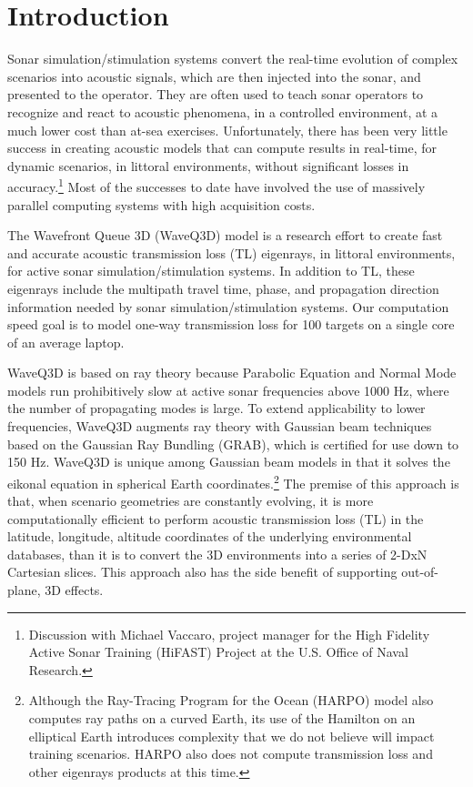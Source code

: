 \documentclass{ws-jca}
\newcommand{\threeD}{3\nobreakdash\textendash D }	%
\begin{document}
\keywords{Gaussian beams; \threeD modeling; range-dependent; time-domain.}

\section{Introduction}

Sonar simulation/stimulation systems convert the real-time evolution of complex scenarios into acoustic signals, which are then injected into the sonar, and presented to the operator.  They are often used to teach sonar operators to recognize and react to acoustic phenomena, in a controlled environment, at a much lower cost than at-sea exercises.  Unfortunately, there has been very little success in creating acoustic models that can compute results in real-time, for dynamic scenarios, in littoral environments, without significant losses in accuracy.\footnote{Discussion with Michael Vaccaro, project manager for the High Fidelity Active Sonar Training
(HiFAST) Project at the U.S. Office of Naval Research.}  Most of the successes to date have involved the use of massively parallel computing systems with high acquisition costs.

The Wavefront Queue \threeD (WaveQ3D) model is a research effort to create fast and accurate acoustic transmission loss (TL) eigenrays, in littoral environments, for active sonar simulation/stimulation systems. In addition to TL, these eigenrays include the multipath travel time, phase, and propagation direction information needed by sonar simulation/stimulation systems.  Our computation speed goal is to model one-way transmission loss for 100 targets on a single core of an average laptop.

WaveQ3D is based on ray theory because Parabolic Equation and Normal Mode models run prohibitively slow at active sonar frequencies above 1000 Hz, where the number of propagating modes is large.  To extend applicability to lower frequencies, WaveQ3D augments ray theory with Gaussian beam techniques based on the Gaussian Ray Bundling (GRAB),\cite{Weinberg1996} which is certified for use down to 150 Hz.\cite{GRAB2008}  
WaveQ3D is unique among Gaussian beam models\cite{Cerveny1982, Porter1994,Porter1987} in that it solves the eikonal equation in spherical Earth coordinates.\footnote{Although the Ray-Tracing Program for the Ocean (HARPO) model \cite{Jones1986} also computes ray paths on a curved Earth, its use of the Hamilton on an elliptical Earth introduces complexity that we do not believe will impact training scenarios.  HARPO also does not compute transmission loss and other eigenrays products at this time.} The premise of this approach is that, when scenario geometries are constantly evolving, it is more computationally efficient to perform acoustic transmission loss (TL) in the latitude, longitude, altitude coordinates of the underlying environmental databases, than it is to convert the \threeD environments into a series of 2-DxN Cartesian slices.  This approach also has the side benefit of supporting out-of-plane, \threeD effects.
\end{document}
